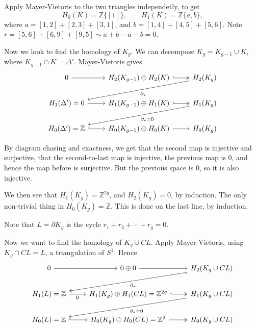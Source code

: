 \documentclass[12pt]{article}
\begin{document}
Apply Mayer-Vietoris to the two triangles independetly, to get
\[
	H_0(K) = \mathbb{Z}\{[1]\}, \qquad H_1(K) = \mathbb{Z}\{a, b\},
\]
where $a = [1, 2] + [2, 3] + [3, 1]$, and $b = [1, 4] + [4, 5] + [5, 6]$. Note $r = [5, 6] + [6, 9] + [9, 5] \sim a  + b - a - b = 0$.

Now we look to find the homology of $K_g$. We can decompose $K_g = K_{g-1} \cup K$, where $K_{g-1} \cap K = \Delta'$. Mayer-Vietoris gives
\begin{equation*}
	\begin{tikzcd}
		0 \arrow[r] & H_2(K_{g-1}) \oplus H_2(K) \arrow[r, hook, two heads] & H_2(K_g) \arrow[dll, "\partial_\ast"] \\
 	H_1(\Delta') = 0 \arrow[r] & H_1(K_{g-1}) \oplus H_1(K) \arrow[r, hook, two heads] & H_1(K_g) \arrow[dll, "\partial_\ast = 0"] \\
 H_0(\Delta') = \mathbb{Z} \arrow[r, hook] & H_0(K_{g-1}) \oplus H_0(K) \arrow[r] & H_0(K_g)
	\end{tikzcd}
\end{equation*}

By diagram chasing and exactness, we get that the second map is injective and surjective, that the second-to-last map is injective, the previous map is 0, and hence the map before is surjective. But the previous space is 0, so it is also injective.

We then see that $H_1(K_g) = \mathbb{Z}^{2g}$, and $H_2(K_g) = 0$, by induction. The only non-trivial thing in $H_0(K_g) = \mathbb{Z}$. This is done on the last line, by induction.

Note that $L = \partial K_g$ is the cycle $r_1 + r_2 + \cdots + r_g = 0$.

Now we want to find the homology of $K_g \cup CL$. Apply Mayer-Vietoris, using $K_g \cap CL = L$, a triangulation of $S^1$. Hence
\begin{equation*}
	\begin{tikzcd}
		0 \arrow[r] & 0 \oplus 0 \arrow[r] & H_2(K_g \cup CL) \arrow[dll, "\partial_\ast", hook, two heads] \\
 	H_1(L) = \mathbb{Z}\arrow[r, "0"'] & H_1(K_g) \oplus H_1(CL) = \mathbb{Z}^{2g} \arrow[r, hook, two heads] & H_1(K_g \cup CL) \arrow[dll, "\partial_\ast = 0"] \\
 H_0(L) = \mathbb{Z}\arrow[r, hook] & H_0(K_g) \oplus H_0(CL) = \mathbb{Z}^2 \arrow[r, two heads] & H_0(K_g \cup CL)
	\end{tikzcd}
\end{equation*}
\end{document}
